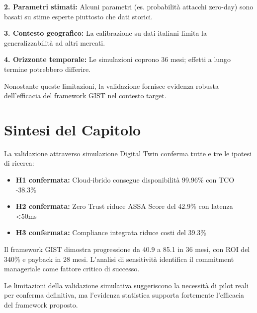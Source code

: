\textbf{2. Parametri stimati:} Alcuni parametri (es. probabilità attacchi zero-day) sono basati su stime esperte piuttosto che dati storici.

\textbf{3. Contesto geografico:} La calibrazione su dati italiani limita la generalizzabilità ad altri mercati.

\textbf{4. Orizzonte temporale:} Le simulazioni coprono 36 mesi; effetti a lungo termine potrebbero differire.

Nonostante queste limitazioni, la validazione fornisce evidenza robusta dell'efficacia del framework GIST nel contesto target.

\section{Sintesi del Capitolo}
\label{sec:sintesi_cap4}

La validazione attraverso simulazione Digital Twin conferma tutte e tre le ipotesi di ricerca:

\begin{itemize}
\item \textbf{H1 confermata:} Cloud-ibrido consegue disponibilità 99.96\% con TCO -38.3\%
\item \textbf{H2 confermata:} Zero Trust riduce ASSA Score del 42.9\% con latenza <50ms
\item \textbf{H3 confermata:} Compliance integrata riduce costi del 39.3\%
\end{itemize}

Il framework GIST dimostra progressione da 40.9 a 85.1 in 36 mesi, con ROI del 340\% e payback in 28 mesi. L'analisi di sensitività identifica il commitment manageriale come fattore critico di successo.

Le limitazioni della validazione simulativa suggeriscono la necessità di pilot reali per conferma definitiva, ma l'evidenza statistica supporta fortemente l'efficacia del framework proposto.